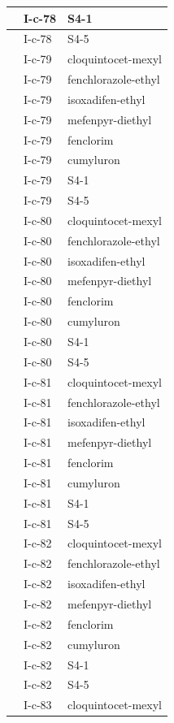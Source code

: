 \documentclass[11pt,a4paper]{article}
\begin{document}
\begin{table}[h]
\begin{tabular}{|l|l|l|}
 & I-c-78 & S4-1 \\ \hline
 & I-c-78 & S4-5 \\ \hline
 & I-c-79 & cloquintocet-mexyl \\ \hline
 & I-c-79 & fenchlorazole-ethyl \\ \hline
 & I-c-79 & isoxadifen-ethyl \\ \hline
 & I-c-79 & mefenpyr-diethyl \\ \hline
 & I-c-79 & fenclorim \\ \hline
 & I-c-79 & cumyluron \\ \hline
 & I-c-79 & S4-1 \\ \hline
 & I-c-79 & S4-5 \\ \hline
 & I-c-80 & cloquintocet-mexyl \\ \hline
 & I-c-80 & fenchlorazole-ethyl \\ \hline
 & I-c-80 & isoxadifen-ethyl \\ \hline
 & I-c-80 & mefenpyr-diethyl \\ \hline
 & I-c-80 & fenclorim \\ \hline
 & I-c-80 & cumyluron \\ \hline
 & I-c-80 & S4-1 \\ \hline
 & I-c-80 & S4-5 \\ \hline
 & I-c-81 & cloquintocet-mexyl \\ \hline
 & I-c-81 & fenchlorazole-ethyl \\ \hline
 & I-c-81 & isoxadifen-ethyl \\ \hline
 & I-c-81 & mefenpyr-diethyl \\ \hline
 & I-c-81 & fenclorim \\ \hline
 & I-c-81 & cumyluron \\ \hline
 & I-c-81 & S4-1 \\ \hline
 & I-c-81 & S4-5 \\ \hline
 & I-c-82 & cloquintocet-mexyl \\ \hline
 & I-c-82 & fenchlorazole-ethyl \\ \hline
 & I-c-82 & isoxadifen-ethyl \\ \hline
 & I-c-82 & mefenpyr-diethyl \\ \hline
 & I-c-82 & fenclorim \\ \hline
 & I-c-82 & cumyluron \\ \hline
 & I-c-82 & S4-1 \\ \hline
 & I-c-82 & S4-5 \\ \hline
 & I-c-83 & cloquintocet-mexyl \\ \hline

\end{tabular}
\end{table}
\end{document}
